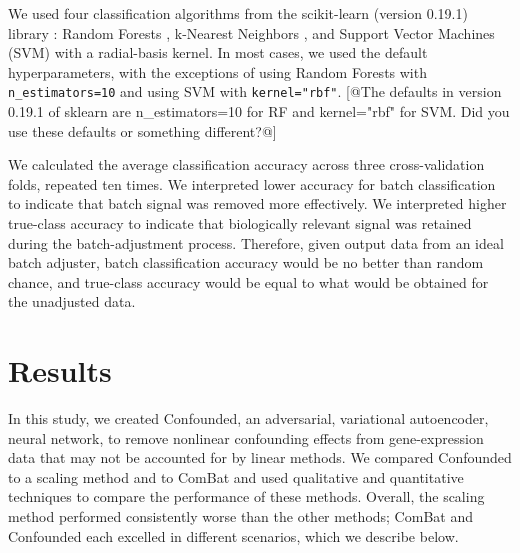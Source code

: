 \documentclass[11pt]{article}
\begin{document}
We used four classification algorithms from the scikit-learn (version 0.19.1) library \cite{pedregosa_scikit-learn_2011}: Random Forests \citep{tin_kam_ho_random_1995}, k-Nearest Neighbors \citep{fix_discriminatory_1951}, and Support Vector Machines (SVM) \citep{cortes_support-vector_1995} with a radial-basis kernel.
In most cases, we used the default hyperparameters, with the exceptions of using Random Forests with \texttt{n\_estimators=10} and using SVM with \texttt{kernel="rbf"}.
[@The defaults in version 0.19.1 of sklearn are n\_estimators=10 for RF and kernel="rbf" for SVM. Did you use these defaults or something different?@] %

We calculated the average classification accuracy across three cross-validation folds, repeated ten times.
We interpreted lower accuracy for batch classification to indicate that batch signal was removed more effectively.
We interpreted higher true-class accuracy to indicate that biologically relevant signal was retained during the batch-adjustment process.
Therefore, given output data from an ideal batch adjuster, batch classification accuracy would be no better than random chance, and true-class accuracy would be equal to what would be obtained for the unadjusted data.

\section{Results} \label{sec:results}

In this study, we created Confounded, an adversarial, variational autoencoder, neural network, to remove nonlinear confounding effects from gene-expression data that may not be accounted for by linear methods.
We compared Confounded to a scaling method and to ComBat \citep{johnson_adjusting_2007} and used qualitative and quantitative techniques to compare the performance of these methods.
Overall, the scaling method performed consistently worse than the other methods;
ComBat and Confounded each excelled in different scenarios, which we describe below.
\end{document}
